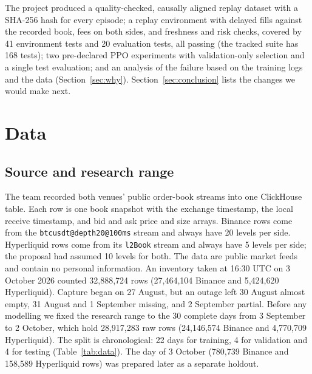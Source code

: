 \documentclass[12pt,a4paper]{article}
\begin{document}
The project produced a quality-checked, causally aligned replay dataset with a SHA-256 hash
for every episode; a replay environment with delayed fills against the recorded book, fees on
both sides, and freshness and risk checks, covered by 41 environment tests and 20 evaluation
tests, all passing (the tracked suite has 168 tests); two pre-declared PPO experiments with
validation-only selection and a single test evaluation; and an analysis of the failure based
on the training logs and the data (Section~\ref{sec:why}). Section~\ref{sec:conclusion} lists
the changes we would make next.

\section{Data}\label{sec:data}

\subsection{Source and research range}
The team recorded both venues' public order-book streams into one ClickHouse table. Each row
is one book snapshot with the exchange timestamp, the local receive timestamp, and bid and
ask price and size arrays. Binance rows come from the \texttt{btcusdt@depth20@100ms} stream
and always have 20 levels per side. Hyperliquid rows come from its \texttt{l2Book} stream and
always have 5 levels per side; the proposal had assumed 10 levels for both. The data are
public market feeds and contain no personal information. An inventory taken at 16:30 UTC on
3 October 2026 counted 32,888,724 rows (27,464,104 Binance and 5,424,620 Hyperliquid).
Capture began on 27 August, but an outage left 30 August almost empty, 31 August and
1 September missing, and 2 September partial. Before any modelling we fixed the research
range to the 30 complete days from 3 September to 2 October, which hold 28,917,283 raw rows
(24,146,574 Binance and 4,770,709 Hyperliquid). The split is chronological: 22 days for
training, 4 for validation and 4 for testing (Table~\ref{tab:data}). The day of 3 October
(780,739 Binance and 158,589 Hyperliquid rows) was prepared later as a separate holdout.
\end{document}
